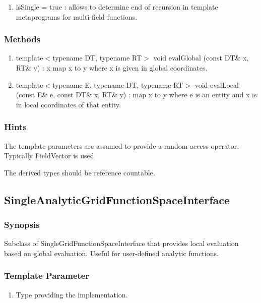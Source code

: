 \documentclass[11pt,a4paper,DIV11,%
notitlepage,oneside,abstracton,%
bibtotoc]{scrartcl}
\begin{document}
\begin{enumerate}[1)]
\item isSingle = true : allows to determine end of recursion in
  template metaprograms for multi-field functions.
\end{enumerate}

\subsubsection{Methods}

\begin{enumerate}[1)]
\item template$<$typename DT, typename RT$>$ void evalGlobal (const
  DT\& x, RT\& y) : x map x to y where x is given in global
  coordinates.
\item template$<$typename E, typename DT, typename RT$>$ void
  evalLocal (const E\& e, const DT\& x, RT\& y) : map x to y where e
  is an entity and x is in local coordinates of that entity.
\end{enumerate}

\subsubsection{Hints}

The template parameters are assumed to provide a random access
operator. Typically FieldVector is used.

The derived types should be reference countable.

\subsection{SingleAnalyticGridFunctionSpaceInterface}

\subsubsection{Synopsis}

Subclass of SingleGridFunctionSpaceInterface that provides local evaluation
based on global evaluation. Useful for user-defined analytic functions.

\subsubsection{Template Parameter}

\begin{enumerate}[1)]
\item Type providing the implementation.
\end{enumerate}
\end{document}

